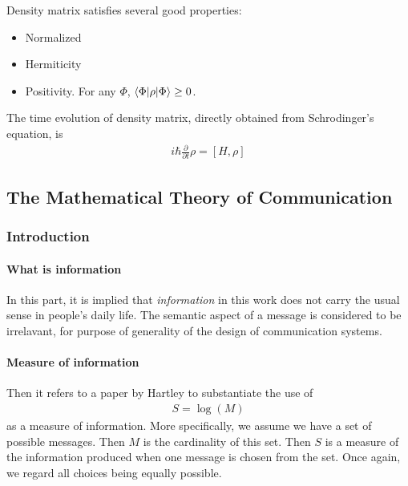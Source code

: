 \documentclass{article}
\numberwithin{equation}{subsection} %
\theoremstyle{definition}
\begin{document}
    Density matrix satisfies several good properties:
    \begin{itemize}
        \item Normalized
        \item Hermiticity
        \item Positivity. For any $\Phi$, $\braket{\Phi|\rho|\Phi} \geq 0$.
    \end{itemize}
    The time evolution of density matrix, directly obtained from Schrodinger's
    equation, is
    \begin{align}
        \label{eq:quantum_macrostates:density_matrix:evolution}
        i\hbar \frac{\partial}{\partial t}\rho = [H,\rho]
    \end{align}

    \subsection{The Mathematical Theory of Communication}
    \label{sec:The_Mathematical_Theory_of_Communication}
    \subsubsection{Introduction}

    \paragraph{What is information}
    In this part, it is implied that \textit{information} in this work
    does not carry the usual sense in people's daily life. The semantic
    aspect of a message is considered to be irrelavant, for purpose
    of generality of the design of communication systems.

    \paragraph{Measure of information} 

    Then it refers to a paper by Hartley to substantiate the use of
    \begin{align}
        \label{eq:measure_of_information}
        S = \log(M)
    \end{align}
    as a measure of information. More specifically, we assume we have a
    set of possible messages. Then $M$ is the cardinality of this set.
    Then $S$ is a measure of the information produced when one message
    is chosen from the set. Once again, we regard all choices 
    being equally possible.
\end{document}
